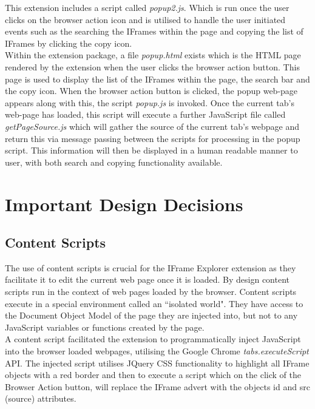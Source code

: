 \documentclass[12pt]{article}
\begin{document}
This extension includes a script called \textit{popup2.js}. Which is run once the user clicks on the browser action icon and is utilised to handle the user initiated events such as the searching the IFrames within the page and copying the list of IFrames by clicking the copy icon. \\

Within the extension package, a file \textit{popup.html} exists which is the HTML page rendered by the extension when the user clicks the browser action button. This page is used to display the list of the IFrames within the page, the search bar and the copy icon. When the browser action button is clicked, the popup web-page appears along with this, the script \textit{popup.js} is invoked. Once the current tab's web-page has loaded, this script will execute a further JavaScript file called \textit{getPageSource.js} which will gather the source of the current tab's webpage and return this via message passing between the scripts for processing in the popup script. This information will then be displayed in a human readable manner to user, with both search and copying functionality available.

\pagebreak

\section{Important Design Decisions}

\subsection{Content Scripts} \label{Content_Scripts}
The use of content scripts is crucial for the IFrame Explorer extension as they facilitate it to edit the current web page once it is loaded. By design content scripts run in the context of web pages loaded by the browser. Content scripts execute in a special environment called an ``isolated world". They have access to the Document Object Model of the page they are injected into, but not to any JavaScript variables or functions created by the page. \\ 

A content script facilitated the extension to programmatically inject JavaScript into the browser loaded webpages, utilising the Google Chrome \textit{tabs.executeScript} API. The injected script utilises JQuery CSS functionality to highlight all IFrame objects with a red border and then to execute a script which on the click of the Browser Action button, will replace the IFrame advert with the objects id and src (source) attributes.  \\
\end{document}
